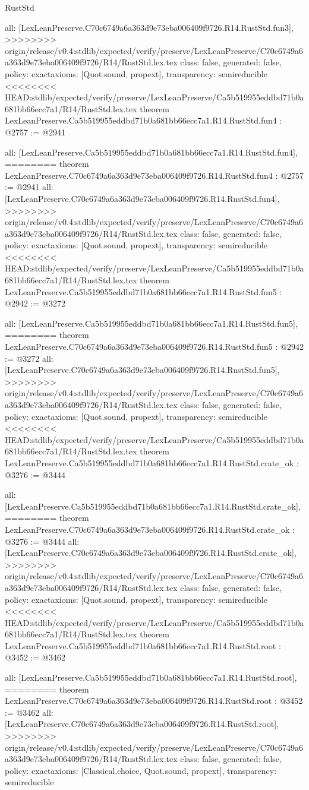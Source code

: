 \begin{lexlean}{RustStd}
\begin{coremodule}
{\begin{coremodule}
{{{{{{{  all: [LexLeanPreserve.C70c6749a6a363d9e73eba006409f9726.R14.RustStd.fun3],
>>>>>>>> origin/release/v0.4:stdlib/expected/verify/preserve/LexLeanPreserve/C70c6749a6a363d9e73eba006409f9726/R14/RustStd.lex.tex
  class: false,
  generated: false,
  policy: exact{axioms: [Quot.sound, propext]},
  transparency: semireducible
}
<<<<<<<< HEAD:stdlib/expected/verify/preserve/LexLeanPreserve/Ca5b519955eddbd71b0a681bb66ecc7a1/R14/RustStd.lex.tex
theorem LexLeanPreserve.Ca5b519955eddbd71b0a681bb66ecc7a1.R14.RustStd.fun4 : @2757 := @2941 {
  all: [LexLeanPreserve.Ca5b519955eddbd71b0a681bb66ecc7a1.R14.RustStd.fun4],
========
theorem LexLeanPreserve.C70c6749a6a363d9e73eba006409f9726.R14.RustStd.fun4 : @2757 := @2941 {
  all: [LexLeanPreserve.C70c6749a6a363d9e73eba006409f9726.R14.RustStd.fun4],
>>>>>>>> origin/release/v0.4:stdlib/expected/verify/preserve/LexLeanPreserve/C70c6749a6a363d9e73eba006409f9726/R14/RustStd.lex.tex
  class: false,
  generated: false,
  policy: exact{axioms: [Quot.sound, propext]},
  transparency: semireducible
}
<<<<<<<< HEAD:stdlib/expected/verify/preserve/LexLeanPreserve/Ca5b519955eddbd71b0a681bb66ecc7a1/R14/RustStd.lex.tex
theorem LexLeanPreserve.Ca5b519955eddbd71b0a681bb66ecc7a1.R14.RustStd.fun5 : @2942 := @3272 {
  all: [LexLeanPreserve.Ca5b519955eddbd71b0a681bb66ecc7a1.R14.RustStd.fun5],
========
theorem LexLeanPreserve.C70c6749a6a363d9e73eba006409f9726.R14.RustStd.fun5 : @2942 := @3272 {
  all: [LexLeanPreserve.C70c6749a6a363d9e73eba006409f9726.R14.RustStd.fun5],
>>>>>>>> origin/release/v0.4:stdlib/expected/verify/preserve/LexLeanPreserve/C70c6749a6a363d9e73eba006409f9726/R14/RustStd.lex.tex
  class: false,
  generated: false,
  policy: exact{axioms: [Quot.sound, propext]},
  transparency: semireducible
}
<<<<<<<< HEAD:stdlib/expected/verify/preserve/LexLeanPreserve/Ca5b519955eddbd71b0a681bb66ecc7a1/R14/RustStd.lex.tex
theorem LexLeanPreserve.Ca5b519955eddbd71b0a681bb66ecc7a1.R14.RustStd.crate_ok : @3276 := @3444 {
  all: [LexLeanPreserve.Ca5b519955eddbd71b0a681bb66ecc7a1.R14.RustStd.crate_ok],
========
theorem LexLeanPreserve.C70c6749a6a363d9e73eba006409f9726.R14.RustStd.crate_ok : @3276 := @3444 {
  all: [LexLeanPreserve.C70c6749a6a363d9e73eba006409f9726.R14.RustStd.crate_ok],
>>>>>>>> origin/release/v0.4:stdlib/expected/verify/preserve/LexLeanPreserve/C70c6749a6a363d9e73eba006409f9726/R14/RustStd.lex.tex
  class: false,
  generated: false,
  policy: exact{axioms: [Quot.sound, propext]},
  transparency: semireducible
}
<<<<<<<< HEAD:stdlib/expected/verify/preserve/LexLeanPreserve/Ca5b519955eddbd71b0a681bb66ecc7a1/R14/RustStd.lex.tex
theorem LexLeanPreserve.Ca5b519955eddbd71b0a681bb66ecc7a1.R14.RustStd.root : @3452 := @3462 {
  all: [LexLeanPreserve.Ca5b519955eddbd71b0a681bb66ecc7a1.R14.RustStd.root],
========
theorem LexLeanPreserve.C70c6749a6a363d9e73eba006409f9726.R14.RustStd.root : @3452 := @3462 {
  all: [LexLeanPreserve.C70c6749a6a363d9e73eba006409f9726.R14.RustStd.root],
>>>>>>>> origin/release/v0.4:stdlib/expected/verify/preserve/LexLeanPreserve/C70c6749a6a363d9e73eba006409f9726/R14/RustStd.lex.tex
  class: false,
  generated: false,
  policy: exact{axioms: [Classical.choice, Quot.sound, propext]},
  transparency: semireducible
}

}}}}}}}}}}
\end{coremodule}}
\end{coremodule}
\end{lexlean}
